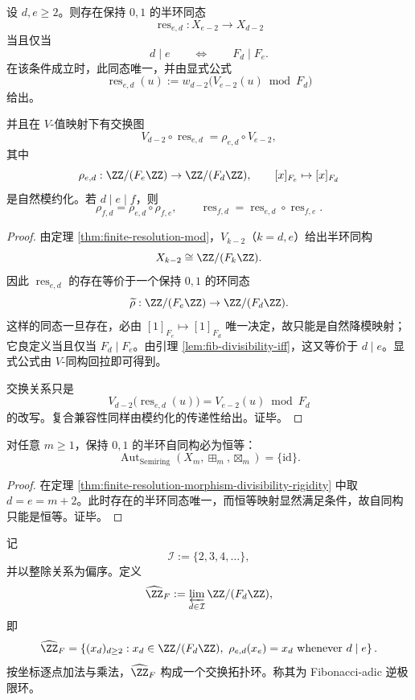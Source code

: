 \begin{theorem}[跨分辨率半环同态的整除刚性与唯一性]\label{thm:finite-resolution-morphism-divisibility-rigidity}
设 \(d,e\ge 2\)。则存在保持 \(0,1\) 的半环同态
\[
\operatorname{res}_{e,d}:X_{e-2}\longrightarrow X_{d-2}
\]
当且仅当
\[
d\mid e
\qquad\Longleftrightarrow\qquad
F_d\mid F_e.
\]
在该条件成立时，此同态唯一，并由显式公式
\[
\operatorname{res}_{e,d}(u)
:=
w_{d-2}\!\bigl(V_{e-2}(u)\bmod F_d\bigr)
\]
给出。

并且在 \(V\)-值映射下有交换图
\[
V_{d-2}\circ \operatorname{res}_{e,d}
=
\rho_{e,d}\circ V_{e-2},
\]
其中
\[
\rho_{e,d}:\ZZ/(F_e\ZZ)\to \ZZ/(F_d\ZZ),\qquad [x]_{F_e}\mapsto [x]_{F_d}
\]
是自然模约化。若 \(d\mid e\mid f\)，则
\[
\rho_{f,d}=\rho_{e,d}\circ \rho_{f,e},
\qquad
\operatorname{res}_{f,d}
=
\operatorname{res}_{e,d}\circ \operatorname{res}_{f,e}.
\]
\end{theorem}
\begin{proof}
由定理 \ref{thm:finite-resolution-mod}，\(V_{k-2}\)（\(k=d,e\)）给出半环同构
\[
X_{k-2}\cong \ZZ/(F_k\ZZ).
\]
因此 \(\operatorname{res}_{e,d}\) 的存在等价于一个保持 \(0,1\) 的环同态
\[
\widetilde\rho:\ZZ/(F_e\ZZ)\to \ZZ/(F_d\ZZ).
\]
这样的同态一旦存在，必由 \([1]_{F_e}\mapsto [1]_{F_d}\) 唯一决定，故只能是自然降模映射；它良定义当且仅当 \(F_d\mid F_e\)。由引理 \ref{lem:fib-divisibility-iff}，这又等价于 \(d\mid e\)。显式公式由 \(V\)-同构回拉即可得到。

交换关系只是
\[
V_{d-2}\bigl(\operatorname{res}_{e,d}(u)\bigr)
=
V_{e-2}(u)\bmod F_d
\]
的改写。复合兼容性同样由模约化的传递性给出。证毕。
\end{proof}

\begin{corollary}[有限分辨率算术的内部自同构刚性]\label{cor:finite-resolution-automorphism-rigidity}
对任意 \(m\ge 1\)，保持 \(0,1\) 的半环自同构必为恒等：
\[
\operatorname{Aut}_{\mathrm{Semiring}}(X_m,\boxplus_m,\boxtimes_m)=\{\mathrm{id}\}.
\]
\end{corollary}
\begin{proof}
在定理 \ref{thm:finite-resolution-morphism-divisibility-rigidity} 中取 \(d=e=m+2\)。此时存在的半环同态唯一，而恒等映射显然满足条件，故自同构只能是恒等。证毕。
\end{proof}

\begin{definition}\label{def:fib-adic-ring}
记
\[
\mathcal I:=\{2,3,4,\dots\},
\]
并以整除关系为偏序。定义
\[
\widehat{\ZZ}_F
:=
\varprojlim_{d\in\mathcal I}\ZZ/(F_d\ZZ),
\]
即
\[
\widehat{\ZZ}_F
=
\left\{
(x_d)_{d\ge 2}:
x_d\in \ZZ/(F_d\ZZ),\
\rho_{e,d}(x_e)=x_d\ \text{whenever } d\mid e
\right\}.
\]
按坐标逐点加法与乘法，\(\widehat{\ZZ}_F\) 构成一个交换拓扑环。称其为 Fibonacci-adic 逆极限环。
\end{definition}

